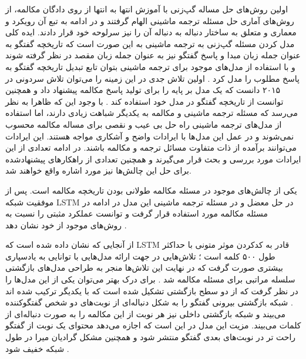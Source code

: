 اولین روش‌های حل مساله گپ‌زنی با آموزش انتها به انتها 	از روی دادگان مکالمه، از روش‌های آماری حل مسئله ترجمه ماشینی الهام گرفتند و در ادامه به تبع آن رویکرد و معماری 
و
متعلق به ساختار دنباله به دنباله آن را نیز سرلوحه خود قرار دادند. ایده کلی مدل‌ کردن مسئله گپ‌زنی به ترجمه ماشینی به این صورت است که تاریخچه گفتگو به عنوان جمله زبان مبدا و پاسخ گفتگو نیز به عنوان جمله زبان مقصد در نظر گرفته شوند و با استفاده از مدل‌های موجود برای ترجمه ماشینی بتوان تابع تبدیل تاریخچه گفتگو به پاسخ مطلوب را مدل کرد
\cite{ritter-etal-2011-data}
.
اولین تلاش جدی در این زمینه را می‌‌توان تلاش سردونی در ۲۰۱۵ دانست که یک مدل بر پایه 
را برای تولید پاسخ مکالمه پیشنهاد داد و همچنین توانست از تاریخچه گفتگو در مدل خود استفاده کند
\cite{DBLP:journals/corr/SordoniGABJMNGD15}
.
با وجود این که ظاهرا به نظر می‌رسد که مسئله ترجمه ماشینی و مکالمه به یکدیگر شباهت زیادی دارند، اما استفاده از مدل‌های ترجمه ماشینی راه حل بی عیب و نقصی برای مساله مکالمه محسوب نمی‌شوند و در عمل این مدل‌ها با ایرادات واضح و آشکاری مواجه هستند. این ایرادات می‌توانند برآمده از ذات متفاوت مسائل ترجمه و مکالمه باشند. در ادامه تعدادی از این ایرادات 
مورد بررسی و بحث قرار می‌گیرند و همچنین تعدادی از راهکارهای پیشنهادشده برای حل این چالش‌ها نیز مورد اشاره واقع خواهند شد. 


یکی از چالش‌های موجود در مسئله مکالمه طولانی بودن تاریخچه مکالمه است. پس از موفقیت شبکه LSTM در حل معضل 
و 
در مسئله ترجمه ماشینی این مدل در ادامه در مسئله مکالمه مورد استفاده قرار گرفت و توانست عملکرد مثبتی را نسبت به روش‌های موجود از خود نشان دهد
\cite{A_Neural_Conversational_Model}.

از آنجایی که نشان داده شده است که LSTM قادر به کدکردن موثر متونی با حداکثر طول ۵۰۰ کلمه است
\cite{DBLP:journals/corr/abs-1805-04623}
؛
تلاش‌هایی در جهت ارائه مدل‌هایی با توانایی به یادسپاری بیشتری صورت گرفت که در نهایت این تلاش‌ها منجر به طراحی مدل‌های بازگشتی سلسله مراتبی برای مسئله مکالمه شد
\cite{DBLP:journals/corr/SerbanSBCP15, DBLP:journals/corr/XingWWZHM17, DBLP:journals/corr/SordoniBVLSN15}.
برای درک بهتر می‌توان یکی از این مدل‌ها را در نظر گرفت که از دو سطح بازگشتی تشکیل شده است که با یکدیگر ترکیب شده اند
\cite{DBLP:journals/corr/SordoniBVLSN15}.
شبکه بازگشتی بیرونی گفتگو را به شکل دنباله‌ای از نوبت‌های دو شخص گفتگوکننده می‌بیند و شبکه بازگشتی داخلی نیز هر نوبت از این مکالمه را به صورت دنباله‌ای از کلمات می‌بیند. مزیت این مدل در این است که اجازه می‌دهد محتوای یک نوبت از گفتگو راحت تر در نوبت‌های بعدی گفتگو منتشر شود و همچنین مشکل گرادیان میرا در طول شبکه خفیف شود
\cite{Gao_Neural_Approaches}.

